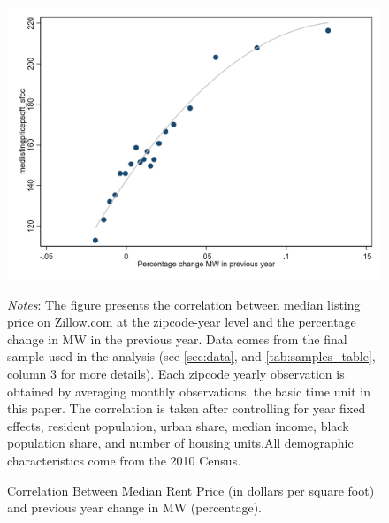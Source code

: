 \begin{figure}[htb]
    \centering
    \caption{Correlation Between Median Rent Price (in dollars per square foot) and previous year change in MW (percentage).}
    \label{appfig:binsc_listing_mwpctchange}
    \includegraphics[width=0.75\linewidth]{draft_june20/tempfigure/binsc_medlistingpricepsqft_sfcc_pctMWch.png}
    \begin{minipage}{.95\textwidth} \footnotesize
		\vspace{2mm} 
		\textit{Notes}: The figure presents the correlation between median listing price on Zillow.com at the zipcode-year level and the percentage change in MW in the previous year. Data comes from the final sample used in the analysis (see \autoref{sec:data}, and \autoref{tab:samples_table}, column 3 for more details). Each zipcode yearly observation is obtained by averaging monthly observations, the basic time unit in this paper. The correlation is taken after controlling for year fixed effects, resident population, urban share, median income, black population share, and number of housing units.All demographic characteristics come from the 2010 Census.
	\end{minipage}
\end{figure}

